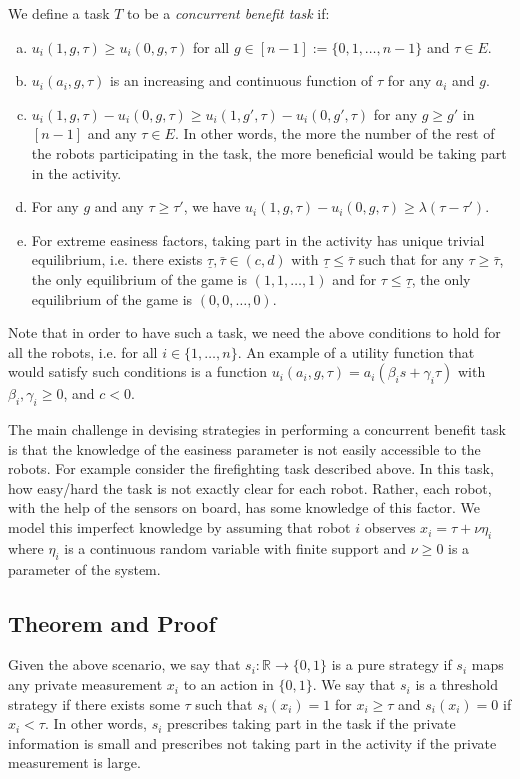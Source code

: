 \documentclass[conference]{ieeeconf}
\def\R{\mathbb{R}}
\begin{document}
We define a task $T$ to be a \textit{concurrent benefit task} if: 
\begin{enumerate}[a.]
	\item $u_i(1,g,\tau)\geq u_i(0,g,\tau)$ for all $g\in[n-1]:=\{0,1,\ldots,n-1\}$ and $\tau \in E$. 
	\item $u_i(a_i,g,\tau)$ is an increasing and continuous function of $\tau$ for any $a_i$ and $g$. 
	\item $u_i(1,g,\tau)-u_i(0,g,\tau)\geq u_i(1,g',\tau)-u_i(0,g',\tau)$ for any $g\geq g'$ in $[n-1]$ and any $\tau\in E$. In other words, the more the number of the rest of the robots participating in the task, the more beneficial would be taking part in the activity.
	\item For any $g$ and any $\tau\geq \tau'$, we have $u_i(1,g,\tau)-u_i(0,g,\tau)\geq \lambda (\tau-\tau')$. 
	\item For extreme easiness factors, taking part in the activity has unique trivial equilibrium, i.e. there exists $\underline{\tau},\bar{\tau}\in (c,d)$ with $\underline{\tau}\leq \bar{\tau}$ such that for any $\tau\geq \bar{\tau}$, the only equilibrium of the game is $(1,1,\ldots,1)$ and for $\tau\leq \underline{\tau}$, the only equilibrium of the game is $(0,0,\ldots,0)$.
\end{enumerate}

Note that in order to have such a task, we need the above conditions to hold for all the robots, i.e. for all $i\in\{1,\ldots,n\}$.
An example of a utility function that would satisfy such conditions is a function $u_i(a_i,g,\tau)=a_i(\beta_is+\gamma_i\tau)$ with $\beta_i,\gamma_i\geq 0$, and $c<0$.

The main challenge in devising strategies in performing a concurrent benefit task is that the knowledge of the easiness parameter is not easily accessible to the robots. For example consider the firefighting task described above. In this task, how easy/hard the task is not exactly clear for each robot. Rather, each robot, with the help of the sensors on board, has some knowledge of this factor. We model this imperfect knowledge by assuming that robot $i$ observes $x_i=\tau+\nu \eta_i$ where $\eta_i$ is a continuous random variable with finite support and $\nu\geq 0$ is a parameter of the system. 

\subsection{Theorem and Proof}\label{sec:thmproof}
Given the above scenario, we say that $s_i:\R\to \{0,1\}$ is a pure strategy if  $s_i$ maps any private measurement $x_i$ to an action in $\{0,1\}$. We say that $s_i$ is a threshold strategy if there exists some $\tau$ such that $s_i(x_i)=1$ for $x_i\geq \tau$ and $s_i(x_i)=0$ if $x_i<\tau$. In other words, $s_i$ prescribes taking part in the task if the private information is small and prescribes not taking part in the activity if the private measurement is large. 
\end{document}
